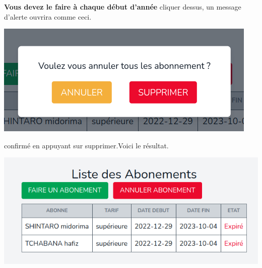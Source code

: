 \documentclass[12pt,a4paper]{article}
\begin{document}
\begin{itemize}
\textbf{Vous devez le faire à chaque début d'année} cliquer dessus, un message d'alerte
ouvrira comme ceci.
\begin{center}
\includegraphics[scale=0.56]{img/abonnement_cancel.png}
\end{center}
confirmé en appuyant sur supprimer.Voici le résultat.
\begin{center}
\includegraphics[scale=0.56]{img/abonnements2.png}
\end{center}
\end{itemize}
\end{document}
